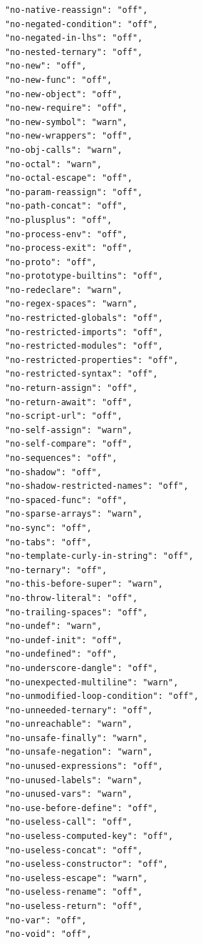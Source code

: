 \begin{small}
\begin{verbatim}
            "no-native-reassign": "off",
            "no-negated-condition": "off",
            "no-negated-in-lhs": "off",
            "no-nested-ternary": "off",
            "no-new": "off",
            "no-new-func": "off",
            "no-new-object": "off",
            "no-new-require": "off",
            "no-new-symbol": "warn",
            "no-new-wrappers": "off",
            "no-obj-calls": "warn",
            "no-octal": "warn",
            "no-octal-escape": "off",
            "no-param-reassign": "off",
            "no-path-concat": "off",
            "no-plusplus": "off",
            "no-process-env": "off",
            "no-process-exit": "off",
            "no-proto": "off",
            "no-prototype-builtins": "off",
            "no-redeclare": "warn",
            "no-regex-spaces": "warn",
            "no-restricted-globals": "off",
            "no-restricted-imports": "off",
            "no-restricted-modules": "off",
            "no-restricted-properties": "off",
            "no-restricted-syntax": "off",
            "no-return-assign": "off",
            "no-return-await": "off",
            "no-script-url": "off",
            "no-self-assign": "warn",
            "no-self-compare": "off",
            "no-sequences": "off",
            "no-shadow": "off",
            "no-shadow-restricted-names": "off",
            "no-spaced-func": "off",
            "no-sparse-arrays": "warn",
            "no-sync": "off",
            "no-tabs": "off",
            "no-template-curly-in-string": "off",
            "no-ternary": "off",
            "no-this-before-super": "warn",
            "no-throw-literal": "off",
            "no-trailing-spaces": "off",
            "no-undef": "warn",
            "no-undef-init": "off",
            "no-undefined": "off",
            "no-underscore-dangle": "off",
            "no-unexpected-multiline": "warn",
            "no-unmodified-loop-condition": "off",
            "no-unneeded-ternary": "off",
            "no-unreachable": "warn",
            "no-unsafe-finally": "warn",
            "no-unsafe-negation": "warn",
            "no-unused-expressions": "off",
            "no-unused-labels": "warn",
            "no-unused-vars": "warn",
            "no-use-before-define": "off",
            "no-useless-call": "off",
            "no-useless-computed-key": "off",
            "no-useless-concat": "off",
            "no-useless-constructor": "off",
            "no-useless-escape": "warn",
            "no-useless-rename": "off",
            "no-useless-return": "off",
            "no-var": "off",
            "no-void": "off",

\end{verbatim}
\end{small}
